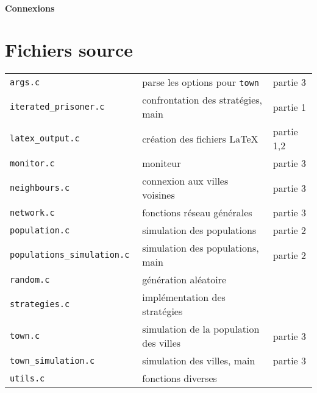 \documentclass[10pt]{article}
\begin{document}
\paragraph{Connexions}



\clearpage
\appendix

\section{Fichiers source}

\begin{tabular}[h]{lll}
\tt{args.c}                       & parse les options pour \verb|town|         & partie 3    \\
\tt{iterated\_{}prisoner.c}       & confrontation des stratégies, main         & partie 1    \\
\tt{latex\_{}output.c}            & création des fichiers \LaTeX               & partie 1,2  \\
\tt{monitor.c}                    & moniteur                                   & partie 3    \\
\tt{neighbours.c}                 & connexion aux villes voisines              & partie 3    \\
\tt{network.c}                    & fonctions réseau générales                 & partie 3    \\
\tt{population.c}                 & simulation des populations                 & partie 2    \\
\tt{populations\_{}simulation.c}  & simulation des populations, main           & partie 2    \\
\tt{random.c}                     & génération aléatoire                       &             \\
\tt{strategies.c}                 & implémentation des stratégies              &             \\
\tt{town.c}                       & simulation de la population des villes     & partie 3    \\
\tt{town\_{}simulation.c}         & simulation des villes, main                & partie 3    \\
\tt{utils.c}                      & fonctions diverses                         &             \\
\end{tabular}
\end{document}
